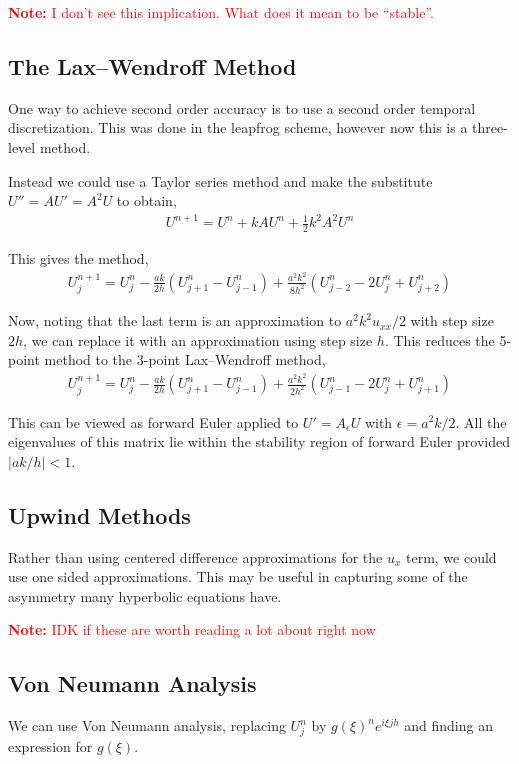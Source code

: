 \documentclass[12pt]{article}
\newcommand{\note}[1]{\textcolor{red}{\textbf{Note:} #1}}
\begin{document}
\note{I don't see this implication. What does it mean to be ``stable''.} 

\subsection{The Lax--Wendroff Method}
One way to achieve second order accuracy is to use a second order temporal discretization. This was done in the leapfrog scheme, however now this is a three-level method.

Instead we could use a Taylor series method and make the substitute \( U'' = AU' = A^2 U \) to obtain,
\begin{align*}
    U^{n+1} = U^n + kAU^n + \frac{1}{2} k^2A^2 U^n
\end{align*}

This gives the method,
\begin{align*}
    U_j^{n+1} = U_j^n - \frac{ak}{2h}(U_{j+1}^n - U_{j-1}^n) + \frac{a^2k^2}{8h^2} (U_{j-2}^n - 2U_j^n+U_{j+2}^n)
\end{align*}

Now, noting that the last term is an approximation to \( a^2k^2u_{xx}/2 \) with step size \( 2h \), we can replace it with an approximation using step size \( h \). This reduces the 5-point method to the 3-point Lax--Wendroff method,
\begin{align*}
    U_j^{n+1} = U_j^n - \frac{ak}{2h}(U_{j+1}^n - U_{j-1}^n) + \frac{a^2k^2}{2h^2} (U_{j-1}^n - 2U_j^n+U_{j+1}^n)
\end{align*}

This can be viewed as forward Euler applied to \( U' = A_\epsilon U \) with \( \epsilon = a^2k/2 \). All the eigenvalues of this matrix lie within the stability region of forward Euler provided \( |ak/h|<1 \).


\subsection{Upwind Methods}
Rather than using centered difference approximations for the \( u_x \) term, we could use one sided approximations. This may be useful in capturing some of the asymmetry many hyperbolic equations have.

\note{IDK if these are worth reading a lot about right now}

\subsection{Von Neumann Analysis}
We can use Von Neumann analysis, replacing \( U_j^n \) by \( g(\xi)^n e^{i\xi j h} \) and finding an expression for \( g(\xi) \).
\end{document}
